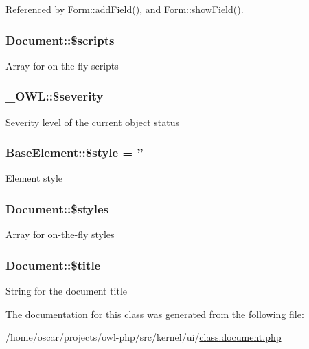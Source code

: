 Referenced by Form::addField(), and Form::showField().

\subsubsection[{\$scripts}]{\setlength{\rightskip}{0pt plus 5cm}Document::\$scripts}\label{classDocument_a011e1486a1c78776019df42ed652f6f0}
Array for on-\/the-\/fly scripts 
\subsubsection[{\$severity}]{\setlength{\rightskip}{0pt plus 5cm}\_\-OWL::\$severity}\label{class__OWL_ad26b40a9dbbacb33e299b17826f8327c}
Severity level of the current object status 
\subsubsection[{\$style}]{\setlength{\rightskip}{0pt plus 5cm}BaseElement::\$style = ''}\label{classBaseElement_a429a3d642dd95f30e1059ef29564b87d}
Element style 
\subsubsection[{\$styles}]{\setlength{\rightskip}{0pt plus 5cm}Document::\$styles}\label{classDocument_a5ef42574b069d405190dea3a7d977cb2}
Array for on-\/the-\/fly styles 
\subsubsection[{\$title}]{\setlength{\rightskip}{0pt plus 5cm}Document::\$title}\label{classDocument_a7cd6b0f7a5c8926d8b89e23bee51e7f5}
String for the document title 

The documentation for this class was generated from the following file:\begin{DoxyCompactItemize}
\item 
/home/oscar/projects/owl-\/php/src/kernel/ui/\hyperlink{class_8document_8php}{class.document.php}\end{DoxyCompactItemize}

